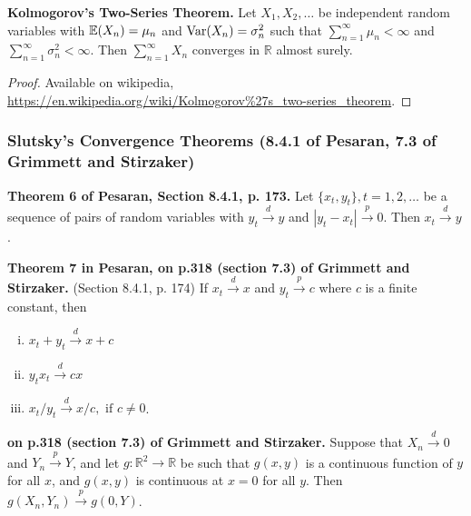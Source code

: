 \begin{theorem}\label{asym:k2st}\textbf{Kolmogorov's Two-Series Theorem.} Let \(X_1, X_2, \ldots\) be independent random variables with \(\mathbb{E}(X_n) = \mu_n\) and \(\mathrm{Var}(X_n) = \sigma_n^2\) such that \(\sum_{n=1}^\infty \mu_n < \infty\) and \(\sum_{n=1}^\infty \sigma_n^2 < \infty\). Then \(\sum_{n=1}^\infty X_n\) converges in \(\mathbb{R}\) almost surely.
\end{theorem}

\begin{proof}Available on wikipedia, \url{https://en.wikipedia.org/wiki/Kolmogorov\%27s_two-series_theorem}.\end{proof}

\subsubsection{Slutsky's Convergence Theorems (8.4.1 of Pesaran, 7.3 of Grimmett and Stirzaker)}

\begin{theorem}\textbf{Theorem 6 of Pesaran, Section 8.4.1, p. 173.} Let \( \{x_t, y_t\}, t = 1, 2, \ldots\) be a sequence of pairs of random variables with \(y_t \xrightarrow{d} y\) and \(\left| y_t - x_t \right| \xrightarrow{p}  0\). Then \(x_t \xrightarrow{d} y\). \end{theorem}

\begin{theorem}\label{asym.slutsky} \textbf{Theorem 7 in Pesaran, on p.318 (section 7.3) of Grimmett and Stirzaker.} (Section 8.4.1, p. 174)  If \(x_t \xrightarrow{d} x\) and \(y_t \xrightarrow{p} c\) where \(c\) is a finite constant, then

\begin{enumerate}[(i)]

\item \(x_t + y_t \xrightarrow{d} x + c\)

\item \(y_tx_t \xrightarrow{d} cx\)

\item \(x_t/y_t \xrightarrow{d}  x/c, \text{ if } c \neq 0\).

\end{enumerate} \end{theorem}

\begin{theorem} \textbf{on p.318 (section 7.3) of Grimmett and Stirzaker.} Suppose that \(X_n \xrightarrow{d} 0\) and \(Y_n \xrightarrow{p} Y\), and let \(g: \mathbb{R}^2 \to \mathbb{R}\) be such that \(g(x,y)\) is a continuous function of \(y\) for all \(x\), and \(g(x, y)\) is continuous at \(x=0\) for all \(y\). Then \(g(X_n, Y_n) \xrightarrow{p} g(0, Y)\). \end{theorem}

